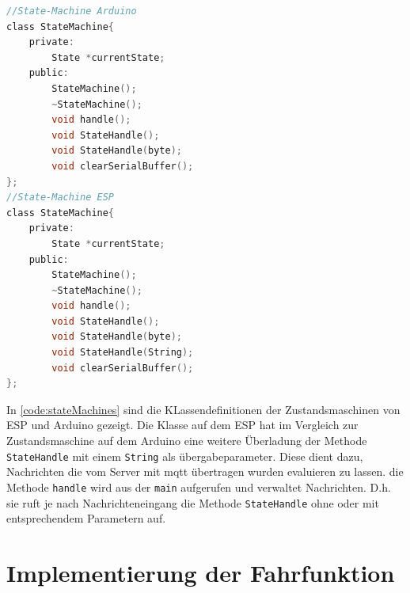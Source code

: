 \begin{lstlisting}[language=c, style=dhpaperdefault]
//State-Machine Arduino
class StateMachine{
	private:
		State *currentState;
	public:
		StateMachine();
		~StateMachine();
		void handle();
		void StateHandle();
		void StateHandle(byte);
		void clearSerialBuffer();
};
//State-Machine ESP
class StateMachine{
	private:
		State *currentState;
	public:
		StateMachine();
		~StateMachine();
		void handle();
		void StateHandle();
		void StateHandle(byte);
		void StateHandle(String);
		void clearSerialBuffer();
};
\end{lstlisting}

In \autoref{code:stateMachines} sind die KLassendefinitionen der Zustandsmaschinen von ESP und Arduino gezeigt. Die Klasse auf dem ESP hat im Vergleich zur Zustandsmaschine auf dem Arduino eine weitere Überladung der Methode \texttt{StateHandle} mit einem \texttt{String} als übergabeparameter. Diese dient dazu, Nachrichten die vom Server mit \acrshort{mqtt} übertragen wurden evaluieren zu lassen. die Methode \texttt{handle} wird aus der \texttt{main} aufgerufen und verwaltet Nachrichten. D.h. sie ruft je nach Nachrichteneingang die Methode \texttt{StateHandle} ohne oder mit entsprechendem Parametern auf. 

\chapter{Implementierung der Fahrfunktion}










%
%
%
%
%
%
%
%
%	


